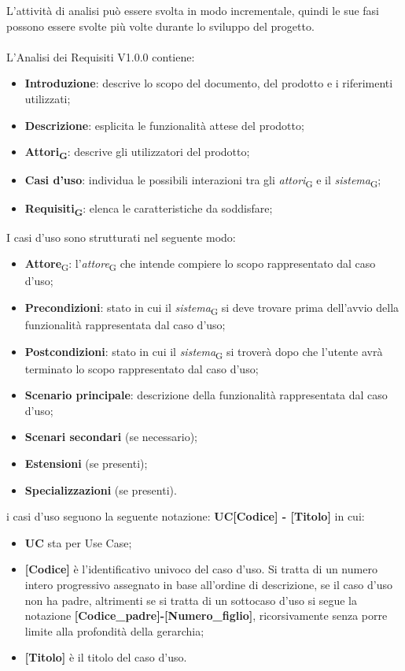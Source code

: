 L'attività di analisi può essere svolta in modo incrementale, quindi le sue fasi possono essere svolte più volte durante lo sviluppo del progetto. 
\\ \\
L'Analisi dei Requisiti V1.0.0 contiene:
\begin{itemize}
    \item \textbf{Introduzione}: descrive lo scopo del documento, del prodotto e i riferimenti utilizzati;
    \item \textbf{Descrizione}: esplicita le funzionalità attese del prodotto;
    \item \textbf{Attori\textsubscript{G}}: descrive gli utilizzatori del prodotto;
    \item \textbf{Casi d'uso}: individua le possibili interazioni tra gli \textit{attori}\textsubscript{G} e il \textit{sistema}\textsubscript{G};
    \item \textbf{Requisiti\textsubscript{G}}: elenca le caratteristiche da soddisfare;
\end{itemize}
I casi d’uso sono strutturati nel seguente modo:
\begin{itemize}
    \item \textbf{Attore}\textsubscript{G}: l’\textit{attore}\textsubscript{G} che intende compiere lo scopo rappresentato dal caso d’uso;
    \item \textbf{Precondizioni}: stato in cui il \textit{sistema}\textsubscript{G} si deve trovare prima dell’avvio della funzionalità rappresentata dal caso d’uso;
    \item \textbf{Postcondizioni}: stato in cui il \textit{sistema}\textsubscript{G} si troverà dopo che l'utente avrà terminato lo scopo rappresentato dal caso d’uso;
    \item \textbf{Scenario principale}: descrizione della funzionalità rappresentata dal caso d’uso;
    \item \textbf{Scenari secondari} (se necessario);
    \item \textbf{Estensioni} (se presenti);
    \item \textbf{Specializzazioni} (se presenti).
\end{itemize}
i casi d'uso seguono la seguente notazione: \textbf{UC[Codice] - [Titolo]} in cui:
\begin{itemize}
    \item \textbf{UC} sta per Use Case;
    \item \textbf{[Codice]} è l'identificativo univoco del caso d'uso. Si tratta di un numero intero progressivo assegnato in base all'ordine di descrizione, se il caso d'uso non ha padre, altrimenti se si tratta di un sottocaso d'uso si segue la notazione\textbf{ [Codice\_padre]-[Numero\_figlio]}, ricorsivamente senza porre limite alla profondità della gerarchia;
    \item \textbf{[Titolo]} è il titolo del caso d'uso.
\end{itemize}

